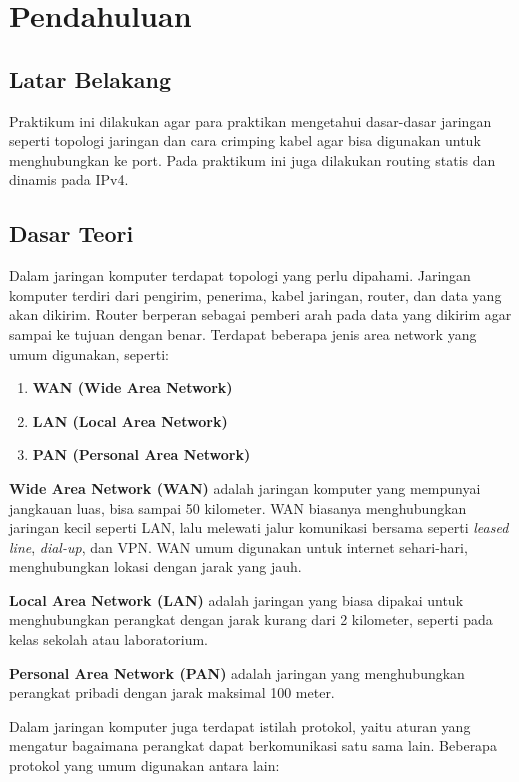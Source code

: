 \section{Pendahuluan}

\subsection{Latar Belakang}
Praktikum ini dilakukan agar para praktikan mengetahui dasar-dasar jaringan seperti topologi jaringan dan cara crimping kabel agar bisa digunakan untuk menghubungkan ke port. Pada praktikum ini juga dilakukan routing statis dan dinamis pada IPv4.

\subsection{Dasar Teori}
Dalam jaringan komputer terdapat topologi yang perlu dipahami. Jaringan komputer terdiri dari pengirim, penerima, kabel jaringan, router, dan data yang akan dikirim. Router berperan sebagai pemberi arah pada data yang dikirim agar sampai ke tujuan dengan benar. Terdapat beberapa jenis area network yang umum digunakan, seperti:

\begin{enumerate}
    \item \textbf{WAN (Wide Area Network)}
    \item \textbf{LAN (Local Area Network)}
    \item \textbf{PAN (Personal Area Network)}
\end{enumerate}

\textbf{Wide Area Network (WAN)} adalah jaringan komputer yang mempunyai jangkauan luas, bisa sampai 50 kilometer. WAN biasanya menghubungkan jaringan kecil seperti LAN, lalu melewati jalur komunikasi bersama seperti \textit{leased line}, \textit{dial-up}, dan VPN. WAN umum digunakan untuk internet sehari-hari, menghubungkan lokasi dengan jarak yang jauh.

\textbf{Local Area Network (LAN)} adalah jaringan yang biasa dipakai untuk menghubungkan perangkat dengan jarak kurang dari 2 kilometer, seperti pada kelas sekolah atau laboratorium.

\textbf{Personal Area Network (PAN)} adalah jaringan yang menghubungkan perangkat pribadi dengan jarak maksimal 100 meter.

Dalam jaringan komputer juga terdapat istilah protokol, yaitu aturan yang mengatur bagaimana perangkat dapat berkomunikasi satu sama lain. Beberapa protokol yang umum digunakan antara lain:

